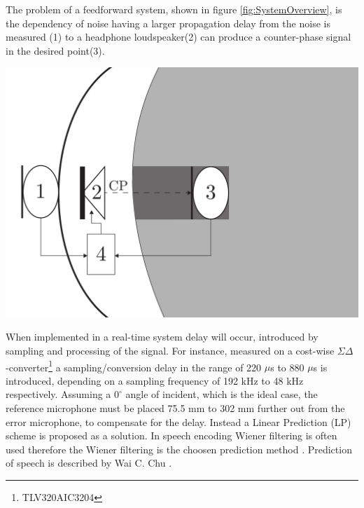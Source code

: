 The problem of a feedforward system, shown in figure \ref{fig:SystemOverview}, is the dependency of noise having a larger propagation delay from the noise is measured (1) to a headphone loudspeaker(2) can produce a counter-phase signal in the desired point(3). 

{
	\centering
	\includegraphics[width=1\columnwidth]{figures/ArticleIllustrations/BasicOverviewZoomed}
	\label{fig:SystemOverview}
}

When implemented in a real-time system delay will occur, introduced by sampling and processing of the signal. For instance, measured on a cost-wise $\Sigma\Delta$ -converter\footnote{TLV320AIC3204} a sampling/conversion delay in the range of 220 $\mu$s to 880 $\mu$s is introduced, depending on a sampling frequency of 192 kHz to 48 kHz respectively. Assuming a $\text{0}^{\circ}$ angle of incident, which is the ideal case, the reference microphone must be placed 75.5 mm to 302 mm further out from the error microphone, to compensate for the delay. Instead a Linear Prediction (LP) scheme is proposed as a solution. In speech encoding Wiener filtering is often used therefore the Wiener filtering is the choosen prediction method \cite{Speech}.
Prediction of speech is described by Wai C. Chu \cite{Speech}. 

